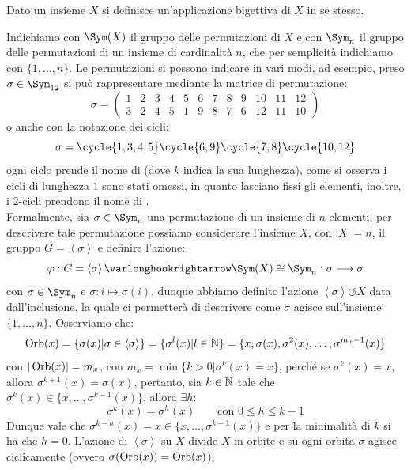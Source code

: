 \documentclass[11pt]{scrartcl}
\begin{document}
\begin{definition}
    Dato un insieme $X$ si definisce  un'applicazione bigettiva di $X$ in se stesso.
\end{definition}

Indichiamo con $\Sym(X)$ il gruppo delle permutazioni di $X$ e con $\Sym_n$ il gruppo delle permutazioni di un insieme di cardinalità $n$, che 
per semplicità indichiamo con $\{1,\ldots,n\}$.
Le permutazioni si possono indicare in vari modi, ad esempio, preso $\sigma \in \Sym_{12}$ si può rappresentare mediante la matrice di permutazione:
    \[ \sigma = \left(\begin{array}{cccccccccccc}
        1 & 2 & 3 & 4 & 5 & 6 & 7 & 8 & 9 & 10 & 11 & 12 \\
        3 & 2 & 4 & 5 & 1 & 9 & 8 & 7 & 6 & 12 & 11 & 10 
        \end{array}\right)
        \]
o anche con la notazione dei cicli:
    \[ \sigma = \cycle{1,3,4,5} \cycle{6,9} \cycle{7,8} \cycle{10,12}
            \]
ogni ciclo prende il nome di  (dove $k$ indica la sua lunghezza), come si osserva i cicli di lunghezza $1$ sono stati omessi,
in quanto lasciano fissi gli elementi, inoltre, i $2$-cicli prendono il nome di .\\
Formalmente, sia $\sigma \in \Sym_n$ una permutazione di un insieme di $n$ elementi, per descrivere tale permutazione
 possiamo considerare l'insieme $X$, con $|X| = n$, il gruppo $G = \left<\sigma\right>$ e definire l'azione:
    \[ \varphi : G = \left<\sigma\right> \varlonghookrightarrow \Sym(X) \cong \Sym_n : \sigma \longmapsto \sigma
        \]
con $\sigma \in \Sym_n$ e $\sigma : i \longmapsto \sigma(i)$, dunque abbiamo definito l'azione $\left<\sigma\right> \circlearrowleft X$ data dall'inclusione, la quale ci permetterà di descrivere come
$\sigma$ agisce sull'insieme $\{1,\ldots,n\}$. Osserviamo che:
    \[ \operatorname{Orb}(x) = \{\sigma(x) | \sigma \in \left<\sigma\right>\} = \{\sigma^l(x) | l \in \mathbb N\} = \{x, \sigma(x), \sigma^2(x),\ldots,\sigma^{m_x-1}(x)\}
        \]
con $|\operatorname{Orb}(x)| = m_x$, con $m_x = \min\{k > 0 | \sigma^k(x) = x\}$, perché se $\sigma^k(x) = x$, allora $\sigma^{k+1}(x) = \sigma(x)$, pertanto, sia $k \in \mathbb N$
tale che $\sigma^k(x) \in \{x,\ldots,\sigma^{k-1}(x)\}$, allora $\exists h:$
    \[ \sigma^k(x) = \sigma^h(x)
    \qquad \text{con $0 \leq h \leq k-1$}
        \]
Dunque vale che $\sigma^{k-h}(x) = x \in \{x,\ldots,\sigma^{k-1}(x)\}$ e per la minimalità di $k$ si ha che $h = 0$.
L'azione di $\left<\sigma\right>$ su $X$ divide $X$ in orbite e su ogni orbita $\sigma$ agisce ciclicamente (ovvero $\sigma(\operatorname{Orb}(x)) = \operatorname{Orb}(x)$).
\end{document}
